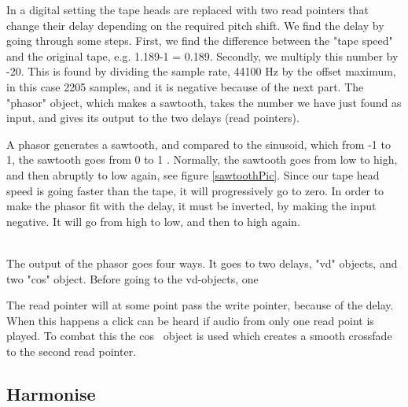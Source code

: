 In a digital setting the tape heads are replaced with two read pointers that change their delay depending on the required pitch shift. 
We find the delay by going through some steps. First, we find the difference between the "tape speed" and the original tape, e.g. 1.189-1 = 0.189. 
Secondly, we multiply this number by -20. This is found by dividing the sample rate, 44100 Hz by the offset maximum, in this case 2205 samples,
and it is negative because of the next part. The "phasor" object, which makes a sawtooth, takes the number we have just found as input, and gives its output to the two delays (read pointers). 

A phasor generates a sawtooth, and compared to the sinusoid, which from -1 to 1, the sawtooth goes from 0 to 1 \citep{FlossManuals}. Normally, the sawtooth goes from low to high, and then abruptly to low again, see figure \ref{sawtoothPic}. Since our tape head speed is going faster than the tape, it will progressively go to zero. In order to make the phasor fit with the delay, it must be inverted, by making the input negative. It will go from high to low, and then to high again.   

\begin{minipage}{\linewidth}%
\label{sawtoothPic}
\end{minipage}\\

The output of the phasor goes four ways. It goes to two delays, "vd" objects, and two "cos" object. Before going to the vd-objects, one 



The read pointer will at some point pass the write pointer, because of the delay. When this happens a click can be heard if audio from only one read point is played. To combat this the cos~ object is used which creates a smooth crossfade to the second read pointer.

\subsection{Harmonise}

